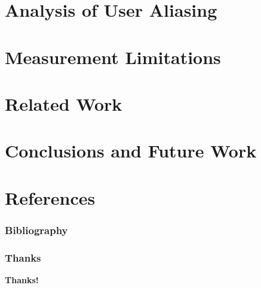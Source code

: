 \documentclass[notes]{beamer}
\begin{document}
\section{Analysis of User Aliasing}
\begin{frame}

\end{frame}

\section{Measurement Limitations}
\begin{frame}

\end{frame}

\section{Related Work}
\begin{frame}

\end{frame}

\section{Conclusions and Future Work}
\begin{frame}

\end{frame}

\section{References}
\begin{frame} %

\frametitle{Bibliography}




\end{frame}

\begin{frame}
\frametitle{Thanks}
\vskip20pt

\begin{center}
{\bf \color{alert} Thanks!}
\end{center}

\vskip20pt

\begin{center}

\vskip12pt
\end{center}

\titlepage
\end{frame}
\end{document}
